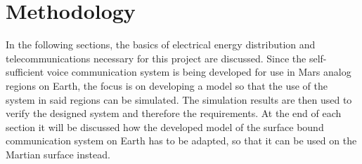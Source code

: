 \chapter{Methodology}
In the following sections, the basics of electrical energy distribution and telecommunications necessary for this project are discussed. Since the self-sufficient voice communication system is being developed for use in Mars analog regions on Earth, the focus is on developing a model so that the use of the system in said regions can be simulated. The simulation results are then used to verify the designed system and therefore the requirements. At the end of each section it will be discussed how the developed model of the surface bound communication system on Earth has to be adapted, so that it can be used on the Martian surface instead.




